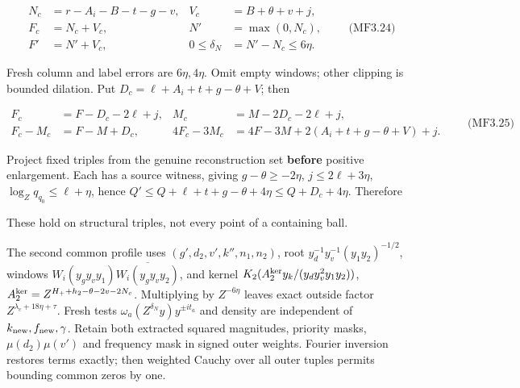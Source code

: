 \[
\begin{aligned}
N_c&=r-A_i-B-t-g-v,& V_c&=B+\theta+v+j,\\
F_c&=N_c+V_c,& N'&=\max(0,N_c),\\
F'&=N'+V_c,&0\le\delta_N&=N'-N_c\le6\eta.
\end{aligned}
\qquad\text{(MF3.24)}
\]

Fresh column and label errors are \(6\eta,4\eta\). Omit empty windows; other clipping is bounded dilation. Put \(D_c=\ell+A_i+t+g-\theta+V\); then

\hypertarget{mf:eq:B3.25}{}

\label{mf:eq:B3.25}

\[
\begin{aligned}
F_c&=F-D_c-2\ell+j,&M_c&=M-2D_c-2\ell+j,\\
F_c-M_c&=F-M+D_c,&
4F_c-3M_c&=4F-3M+2(A_i+t+g-\theta+V)+j.
\end{aligned}\qquad\text{(MF3.25)}
\]

Project fixed triples from the genuine reconstruction set \textbf{before} positive enlargement. Each has a source witness, giving \(g-\theta\ge-2\eta\), \(j\le2\ell+3\eta\), \(\log_Zq_{q_0}\le\ell+\eta\), hence \(Q'\le Q+\ell+t+g-\theta+4\eta\le Q+D_c+4\eta\). Therefore

\hypertarget{mf:eq:B3.26}{}

\label{mf:eq:B3.26}

\par\noindent{}\par

These hold on structural triples, not every point of a containing ball.

\begin{sloppypar}
The second common profile uses \((g',d_2,v',k'',n_1,n_2)\), root \(y_d^{-1}y_v^{-1}(y_1y_2)^{-1/2}\), windows \(W_i(y_gy_vy_1)\overline{W_i(y_gy_vy_2)}\), and kernel \(K_2(A_2^{\rm ker}y_k/(y_dy_v^2y_1y_2))\), \(A_2^{\rm ker}=Z^{H_++h_2-\theta-2v-2N_c}\). Multiplying by \(Z^{-6\eta}\) leaves exact outside factor \(Z^{\lambda_c+18\eta+\tau}\). Fresh tests \(\omega_a(Z^{\delta_N}y)y^{\pm it_a}\) and density are independent of \(k_{\rm new},f_{\rm new},\gamma\). Retain both extracted squared magnitudes, priority masks, \(\mu(d_2)\mu(v')\) and frequency mask in signed outer weights. Fourier inversion restores terms exactly; then weighted Cauchy over all outer tuples permits bounding common zeros by one.
\end{sloppypar}

